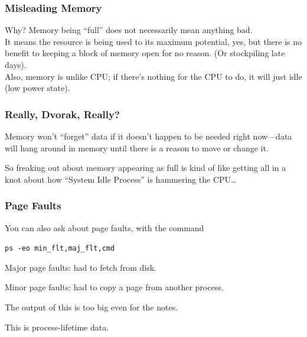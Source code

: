 \begin{frame}
\frametitle{Misleading Memory}



Why? Memory being ``full'' does not necessarily mean anything bad. \\[1em]

It means the resource is being used to its maximum potential, yes, but there is no benefit to keeping a block of memory open for no reason. (Or stockpiling late days).\\[1em]

Also, memory is unlike CPU; if there's nothing for the CPU to do, it will just idle (low power state).


\end{frame}


\begin{frame}
\frametitle{Really, Dvorak, Really?}



Memory won't ``forget'' data if it doesn't happen to be needed right now---data will hang around in memory until there is a reason to move or change it. 

So freaking out about memory appearing as full is kind of like getting all in a knot about how ``System Idle Process'' is hammering the CPU\ldots


\end{frame}




\begin{frame}
\frametitle{Page Faults}



You can also ask about page faults, with the command
\begin{center}
\texttt{ps -eo min\_flt,maj\_flt,cmd}
\end{center}

Major page faults: had to fetch from disk. 

Minor page faults: had to copy a page from another process. 

The output of this is too big even for the notes.

This is process-lifetime data.

\end{frame}



